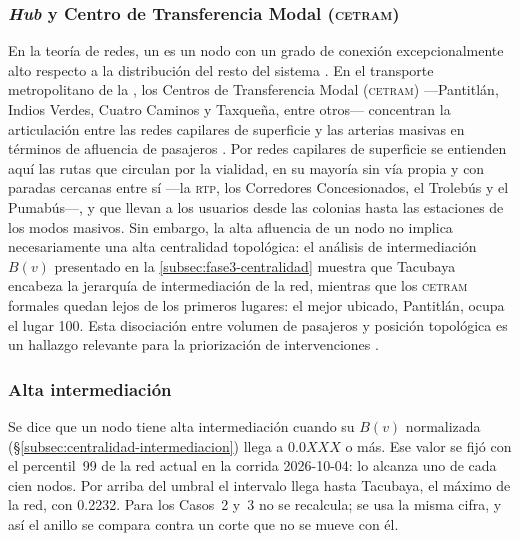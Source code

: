 \subsubsection*{\textit{Hub} y Centro de Transferencia Modal (\textsc{cetram})}
\label{subsubsec:glosario-hub-cetram}
En la teoría de redes, un  es un nodo con un grado de conexión
excepcionalmente alto respecto a la distribución del resto del sistema
\citep{newman2010networks}. En el transporte metropolitano de la \cdmx{}, los
Centros de Transferencia Modal (\textsc{cetram}) ---Pantitlán, Indios Verdes,
Cuatro Caminos y Taxqueña, entre otros--- concentran la articulación entre las
redes capilares de superficie y las arterias masivas en términos de afluencia de
pasajeros \citep{semovi2020diagnostico}. Por redes capilares de superficie se
entienden aquí las rutas que circulan por la vialidad, en su mayoría sin vía
propia y con paradas cercanas entre sí ---la \textsc{rtp}, los Corredores
Concesionados, el Trolebús y el Pumabús---, y que llevan a los usuarios desde
las colonias hasta las estaciones de los modos masivos. Sin embargo, la alta afluencia de un
nodo no implica necesariamente una alta centralidad topológica: el análisis de
intermediación $B(v)$ presentado en la \autoref{subsec:fase3-centralidad}
muestra que Tacubaya encabeza la jerarquía de intermediación de la red, mientras
que los \textsc{cetram} formales quedan lejos de los primeros lugares: el mejor
ubicado, Pantitlán, ocupa el lugar 100. Esta
disociación entre volumen de pasajeros y posición topológica es un hallazgo
relevante para la priorización de intervenciones
\citep{lotero2014vulnerabilidad}.

\subsubsection*{Alta intermediación}
\label{subsubsec:glosario-alta-intermediacion}
Se dice que un nodo tiene alta intermediación cuando su $B(v)$ normalizada
(§\ref{subsec:centralidad-intermediacion}) llega a $0.0XXX$ o más. Ese valor
se fijó con el percentil~99 de la red actual en la corrida 2026-10-04: lo
alcanza uno de cada cien nodos. Por arriba del umbral el intervalo llega hasta
Tacubaya, el máximo de la red, con 0.2232. Para los Casos~2 y~3 no se recalcula;
se usa la misma cifra, y así el anillo se compara contra un corte que no se
mueve con él.


